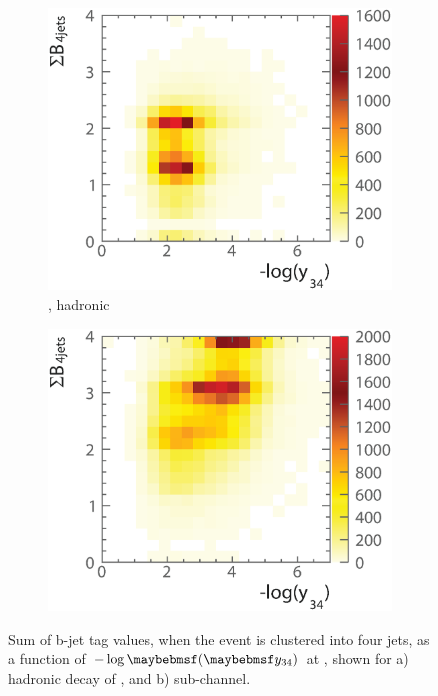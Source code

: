 \begin{figure}[!tbp]
  \begin{subfigure}[b]{0.45\textwidth}
    \includegraphics[width=\textwidth]{doubleHiggs/preSel/mutual6022bbWW2}
    \caption{\eeToHHbbWW, hadronic}
    \label{fig:doubleHiggs1.4MutualbbWW}
  \end{subfigure}
    \begin{subfigure}[b]{0.45\textwidth}
    \includegraphics[width=\textwidth]{doubleHiggs/preSel/mutual6022bbbb2}
    \caption{\eeToHHbbbb}
    \label{fig:doubleHiggs1.4Mutualbbbb}
  \end{subfigure}
\caption[Sum of b-jet tag values as a function of $-\log\parenths{\y{34}}$ at ]%
   {Sum of b-jet tag values, when the event is clustered into four jets, as a function of $-\log\parenths{\y{34}}$ at , shown for a) hadronic \WW decay of \eeToHHbbWW, and b) \eeToHHbbbb sub-channel. }
   \label{fig:doubleHiggsMutualPreselection}
\end{figure}


